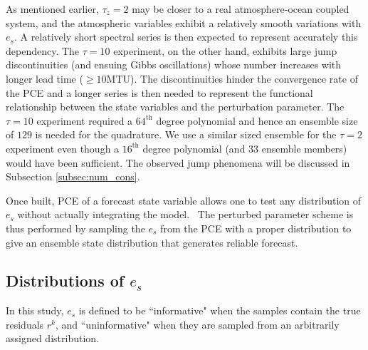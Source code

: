 			As mentioned earlier, $\tau_z=2$ may be closer to a real
			atmosphere-ocean coupled system, and the atmospheric variables exhibit a relatively smooth
			variations with $e_s$. A relatively short spectral series is then expected to represent
			accurately this dependency. 
			The $\tau=10$ experiment, on the
			other hand, exhibits large jump discontinuities (and ensuing Gibbs oscillations) 
			whose number increases with longer lead time ($\ge 10$MTU).
			The discontinuities hinder the convergence rate of the PCE and a longer series is
			then needed to represent the functional relationship between the state variables and the perturbation parameter.
			The $\tau=10$ experiment required a $64^{\text{th}}$ degree polynomial and hence an ensemble size of $129$ is needed for the 
			quadrature. We use a similar sized ensemble for the $\tau=2$ experiment even though a $16^{\text{th}}$ degree polynomial
			(and $33$ ensemble members) would have been sufficient.
			The observed jump phenomena will be discussed in Subsection \ref{subsec:num_cons}.\
			
			Once built, PCE of a forecast state variable allows one to test any distribution of 
			$e_s$ without actually integrating the model.\
			The perturbed parameter scheme is thus performed by sampling 
			the $e_s$ from the PCE with a proper distribution to give 
			an ensemble state distribution that generates reliable forecast.\ 


		\subsection{Distributions of $e_s$} \label{subsec:dist_es}
			In this study, $e_s$ is defined to be ``informative" when the samples 
			contain the true residuals $r^k$, and ``uninformative" when they are sampled from an 
			arbitrarily assigned distribution.


